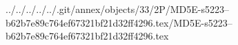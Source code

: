 ../../../../../.git/annex/objects/33/2P/MD5E-s5223--b62b7e89c764ef67321bf21d32ff4296.tex/MD5E-s5223--b62b7e89c764ef67321bf21d32ff4296.tex